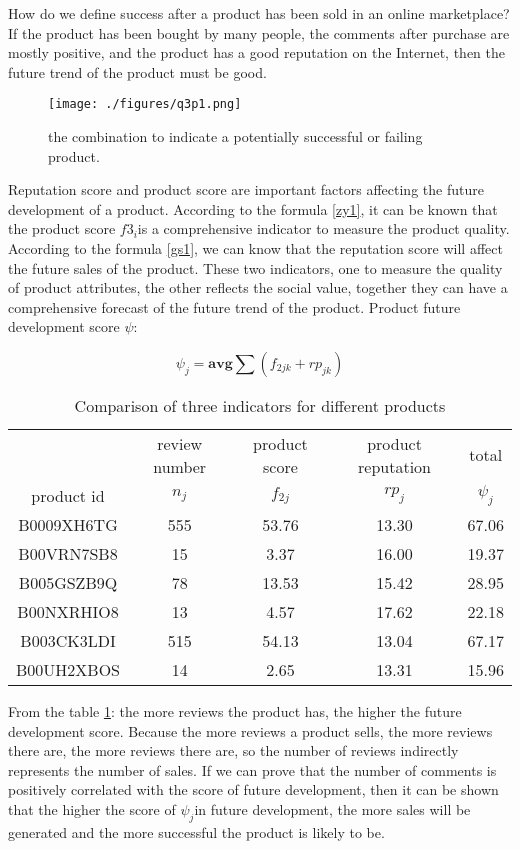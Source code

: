 \documentclass{mcmthesis}
\begin{document}
How do we define success after a product has been sold in an online marketplace? If the product has been bought by many people, the comments after purchase are mostly positive, and the product has a good reputation on the Internet, then the future trend of the product must be good.

\begin{figure}[H]
	\centering
	\texttt{[image: ./figures/q3p1.png]}
	\caption{the combination to indicate a potentially successful or failing product.} \label{q3p11}
\end{figure}

Reputation score and product score are important factors affecting the future development of a product. According to the formula \ref{zy1}, it can be known that the product score $f3_i$is a comprehensive indicator to measure the product quality. According to the formula \ref{gs1}, we can know that the reputation score will affect the future sales of the product. These two indicators, one to measure the quality of product attributes, the other reflects the social value, together they can have a comprehensive forecast of the future trend of the product. Product future development score $\psi$:

\begin{equation}\label{gs4q1}
\psi_j=\mathbf{avg}\sum (f_{2jk}+rp_{jk})
\end{equation}

\begin{table}[H]	
	\caption{Comparison of three indicators for different products}\label{biao4q1}
	\centering
	\begin{tabular}{c|cccc}
		\hline &review number & product score  & product reputation  & total  \\
		product id &$n_j$ & $f_{2j}$ & $rp_{j}$ & $\psi_j$ \\
		\hline B0009XH6TG & 555 & 53.76 & 13.30 & 67.06 \\
		B00VRN7SB8 & 15 & 3.37 & 16.00 & 19.37 \\
		B005GSZB9Q & 78 & 13.53 & 15.42 & 28.95 \\
		B00NXRHIO8 & 13 & 4.57 & 17.62 & 22.18 \\
		B003CK3LDI & 515 & 54.13 & 13.04 & 67.17 \\
		B00UH2XBOS & 14 & 2.65 & 13.31 & 15.96 \\
		\hline
	\end{tabular}
\end{table}

From the table \ref{biao4q1}: the more reviews the product has, the higher the future development score. Because the more reviews a product sells, the more reviews there are, the more reviews there are, so the number of reviews indirectly represents the number of sales. If we can prove that the number of comments is positively correlated with the score of future development, then it can be shown that the higher the score of $\psi_j$in future development, the more sales will be generated and the more successful the product is likely to be.
\end{document}
